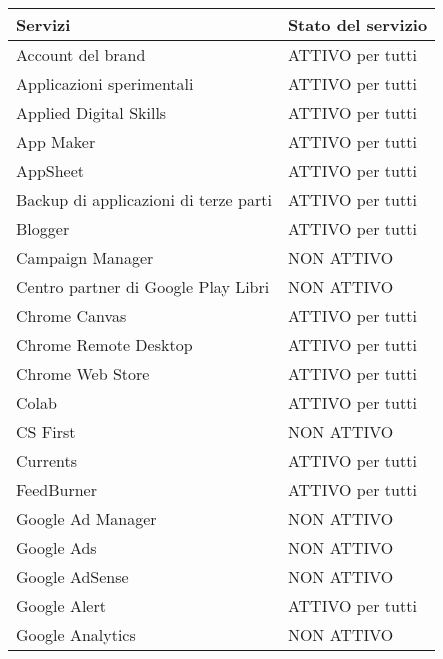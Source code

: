 \begin{center}
	\begin{tabular}{ll}
	\toprule
	Servizi&Stato del servizio\\
	\midrule 
Account del brand&
ATTIVO per tutti\\

Applicazioni sperimentali&
ATTIVO per tutti\\

Applied Digital Skills&
ATTIVO per tutti\\

App Maker&
ATTIVO per tutti\\

AppSheet&
ATTIVO per tutti\\

Backup di applicazioni di terze parti&
ATTIVO per tutti\\

Blogger&
ATTIVO per tutti\\

Campaign Manager&
NON ATTIVO\\

Centro partner di Google Play Libri&
NON ATTIVO\\

Chrome Canvas&
ATTIVO per tutti\\

Chrome Remote Desktop&
ATTIVO per tutti\\

Chrome Web Store&
ATTIVO per tutti\\

Colab&
ATTIVO per tutti\\

CS First&
NON ATTIVO\\

Currents&
ATTIVO per tutti\\

FeedBurner&
ATTIVO per tutti\\

Google Ad Manager&
NON ATTIVO\\

Google Ads&
NON ATTIVO\\

Google AdSense&
NON ATTIVO\\

Google Alert&
ATTIVO per tutti\\

Google Analytics&
NON ATTIVO\\


\end{tabular}
\end{center}
